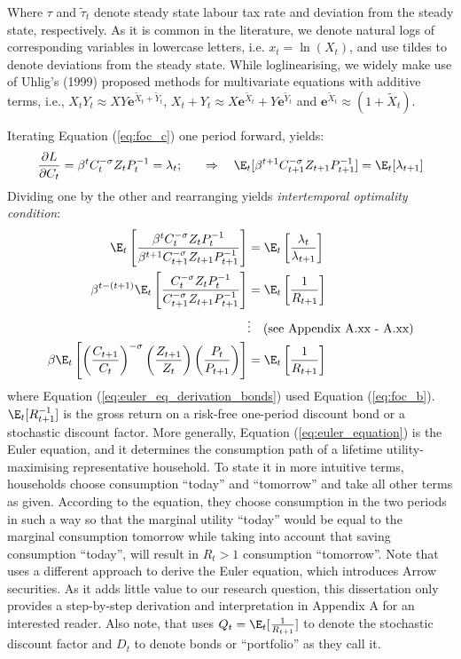 Where $\tau$ and $\tilde{\tau}_t$ denote steady state labour tax rate and deviation from the steady state, respectively. As it is common in the literature, we denote natural logs of corresponding variables in lowercase letters, i.e. $x_t = \ln(X_t)$, and use tildes to denote deviations from the steady state. While loglinearising, we widely make use of Uhlig's (1999) proposed methods for multivariate equations with additive terms, i.e., $X_tY_t \approx XY\mathbf{e}^{\tilde{X}_t + \tilde{Y}_t}$, $X_t + Y_t \approx X\mathbf{e}^{\tilde{X}_t} + Y\mathbf{e}^{\tilde{Y}_t}$ and $\mathbf{e}^{\tilde{X}_t} \approx (1 + \tilde{X}_t)$. 

Iterating Equation (\ref{eq:foc_c}) one period forward, yields:
\begin{align*}
    \frac{\partial L}{\partial C_t}     &= \beta^t C_t^{-\sigma}Z_t P_{t}^{-1} = \lambda_t; \quad &\Rightarrow \quad \E_t[\beta^{t+1} C_{t+1}^{-\sigma}Z_{t+1} P_{t+1}^{-1}] = \E_t[\lambda_{t+1}]
\end{align*}
Dividing one by the other and rearranging yields \textit{intertemporal optimality condition}:
\begin{align}
    \E_t\left[\frac{\beta^t C_t^{-\sigma}Z_t P_{t}^{-1}}{\beta^{t+1} C_{t+1}^{-\sigma}Z_{t+1} P_{t+1}^{-1}}\right]                 & = \E_t\left[\frac{\lambda_t}{\lambda_{t+1}}\right] \nonumber\\
    \beta^{t-(t+1)}\E_t\left[\frac{C_t^{-\sigma}Z_t P_{t}^{-1}}{C_{t+1}^{-\sigma}Z_{t+1} P_{t+1}^{-1}}\right]                 & = \E_t\left[\frac{1}{R_{t+1}}\right] \label{eq:euler_eq_derivation_bonds}\\
    &\vdots \quad \text{(see Appendix A.xx - A.xx)}\nonumber\\
    \beta\E_t\left[\left(\frac{C_{t+1}}{C_{t}}\right)^{-\sigma} \left(\frac{Z_{t+1}}{Z_t}\right) \left(\frac{P_{t}}{ P_{t+1}}\right)\right]                 &= \E_t \left[\frac{1}{R_{t+1}}\right] \label{eq:euler_equation}
\end{align}
where Equation (\ref{eq:euler_eq_derivation_bonds}) used Equation (\ref{eq:foc_b}). $\E_t [ R^{-1}_{t+1}]$ is the gross return on a risk-free one-period discount bond or a stochastic discount factor. More generally, Equation (\ref{eq:euler_equation}) is the Euler equation, and it determines the consumption path of a lifetime utility-maximising representative household. To state it in more intuitive terms, households choose consumption ``today'' and ``tomorrow'' and take all other terms as given. According to the equation, they choose consumption in the two periods in such a way so that the marginal utility ``today'' would be equal to the marginal consumption tomorrow while taking into account that saving consumption ``today'', will result in $R_t > 1$ consumption ``tomorrow''. Note that \textcite{jordigal_2015_monetary} uses a different approach to derive the Euler equation, which introduces Arrow securities. As it adds little value to our research question, this dissertation only provides a step-by-step derivation and interpretation in Appendix A for an interested reader. Also note, that \textcite{jordigal_2015_monetary} uses $Q_t = \E_t [ \frac{1}{R_{t+1}}]$ to denote the stochastic discount factor and $D_t$ to denote bonds or ``portfolio'' as they call it.

